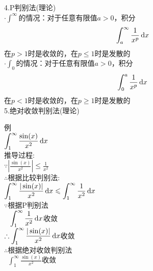 4.P判别法(理论)\\
$\displaystyle\cdot\int^{\infty}$的情况：对于任意有限值$a>0$，积分
\[\int_a^{\infty}\frac{1}{x^p}\mathop{}\!\mathrm{d} x\]
\phantom{$\cdot$}在$p>1$时是收敛的，在$p\leqslant 1$时是发散的\\
$\displaystyle\cdot\int_0$的情况：对于任意有限值$a>0$，积分
\[\int_0^a\frac{1}{x^p}\mathop{}\!\mathrm{d} x\]
\phantom{$\cdot$}在$p<1$时是收敛的，在$p\geqslant 1$时是发散的\\[4ex]

5.绝对收敛判别法(理论)
{\par\centering
{}
\par}
例\\
$\displaystyle\int_1^{\infty}\frac{\sin(x)}{x^2}\mathop{}\!\mathrm{d} x$\\
推导过程:\\
$\displaystyle\because|\frac{\sin(x)}{x^2}|\leqslant\frac{1}{x^2}$\\
$\therefore$根据比较判别法:\\
$\displaystyle\int_1^{\infty}\frac{|\sin(x)|}{x^2}\mathop{}\!\mathrm{d} x\leqslant\int_1^{\infty}\frac{1}{x^2}\mathop{}\!\mathrm{d} x$\\
$\because$根据P判别法\\
$\displaystyle\phantom{\because}\int_1^{\infty}\frac{1}{x^2}\mathop{}\!\mathrm{d} x$收敛\\[1ex]
$\displaystyle\therefore\int_1^{\infty}\frac{|\sin(x)|}{x^2}\mathop{}\!\mathrm{d} x$收敛\\
$\therefore$根据绝对收敛判别法\\
$\displaystyle\phantom{\therefore}\int_1^{\infty}\frac{\sin(x)}{x^2}$收敛
